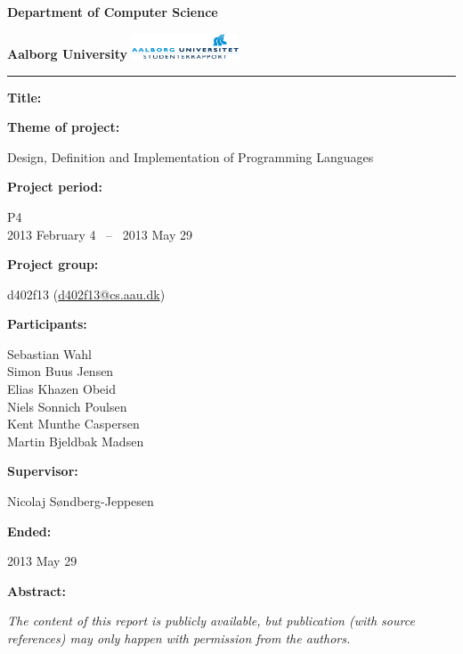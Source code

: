 \begin{nopagebreak}
\LARGE{\textbf{Department of Computer Science}}\vspace{-0.6cm}

\large{\textbf{Aalborg University}}
\hspace{5.70cm}\includegraphics[height=0.75cm]{pictures/aau_logo.pdf}


\hrule

\newcommand{\titleitem}[2]{\textbf{#1:}

\hspace*{0.5cm}
\begin{minipage}{0.9\columnwidth}#2\end{minipage}
\vspace{0.25cm}}
\begin{multicols}{2}

\titleitem{Title}{}

\titleitem{Theme of project}{Design, Definition and Implementation of Programming Languages}

\titleitem{Project period}{P4\\2013 February 4 ~--~ 2013 May 29}

\titleitem{Project group}{d402f13 (\url{d402f13@cs.aau.dk})}

\titleitem{Participants}{
    Sebastian Wahl\\
    Simon Buus Jensen\\
    Elias Khazen Obeid\\
    Niels Sonnich Poulsen\\
    Kent Munthe Caspersen\\
    Martin Bjeldbak Madsen
}

\titleitem{Supervisor}{Nicolaj Søndberg-Jeppesen}

\titleitem{Ended}{2013 May 29}

\vfill
\columnbreak

\titleitem{Abstract}{}

\end{multicols}
\centering
\textit{The content of this report is publicly available, but publication (with source references) may only happen with permission from the authors.}

\end{nopagebreak}
